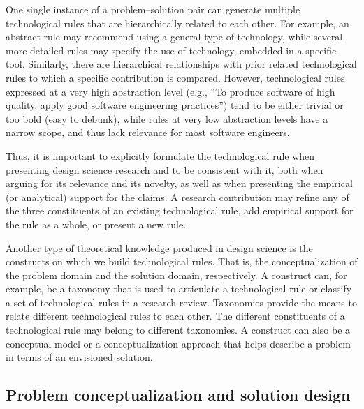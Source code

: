 \documentclass[graybox]{svmult}
\begin{document}
One single instance of a problem--solution pair can generate multiple technological rules that are hierarchically related to each other. For example, an abstract rule may recommend using a general type of technology, while several more detailed rules may specify the use of technology, embedded in a specific tool. Similarly, there are hierarchical relationships with prior related technological rules to which a specific contribution is compared.
However, technological rules expressed at a very high abstraction level (e.g., ``To produce software of high quality, apply good software engineering practices'') tend to be either trivial or too bold (easy to debunk), while rules at very low abstraction levels have a narrow scope, and thus lack relevance for most software engineers. 

Thus, it is important to explicitly formulate the technological rule when presenting design science research and to be consistent with it, both when arguing for its relevance and its novelty, as well as when presenting the empirical (or analytical) support for the claims. A research contribution may refine any of the three constituents of an existing technological rule, add empirical support for the rule as a whole, or present a new rule.


Another type of theoretical knowledge produced in design science is the 
constructs on which we build technological rules. That is, the conceptualization of the problem domain and the solution domain, respectively.  
A construct can, for example, be a taxonomy that is used to articulate a technological rule or classify a set of technological rules in a research review. 
Taxonomies provide the means to relate different technological rules to each other. The different constituents of a technological rule may belong to different taxonomies. A construct can also be a conceptual model or a conceptualization approach that helps describe a problem in terms of an envisioned solution.

\subsection{Problem conceptualization and solution design}

\end{document}
